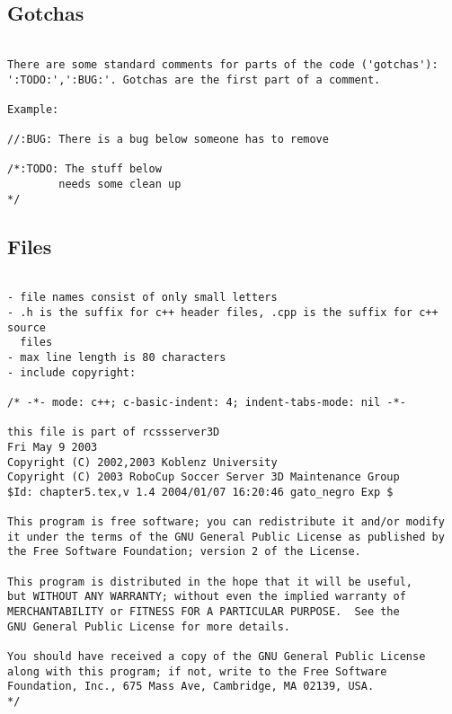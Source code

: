 \subsection{Gotchas}
\begin{verbatim}

There are some standard comments for parts of the code ('gotchas'): 
':TODO:',':BUG:'. Gotchas are the first part of a comment.

Example:

//:BUG: There is a bug below someone has to remove

/*:TODO: The stuff below
        needs some clean up
*/

\end{verbatim}
\subsection{Files}
\begin{verbatim}

- file names consist of only small letters
- .h is the suffix for c++ header files, .cpp is the suffix for c++ source 
  files
- max line length is 80 characters
- include copyright:

/* -*- mode: c++; c-basic-indent: 4; indent-tabs-mode: nil -*-
   
this file is part of rcssserver3D
Fri May 9 2003
Copyright (C) 2002,2003 Koblenz University
Copyright (C) 2003 RoboCup Soccer Server 3D Maintenance Group
$Id: chapter5.tex,v 1.4 2004/01/07 16:20:46 gato_negro Exp $

This program is free software; you can redistribute it and/or modify
it under the terms of the GNU General Public License as published by
the Free Software Foundation; version 2 of the License.
  
This program is distributed in the hope that it will be useful,
but WITHOUT ANY WARRANTY; without even the implied warranty of
MERCHANTABILITY or FITNESS FOR A PARTICULAR PURPOSE.  See the
GNU General Public License for more details.
 
You should have received a copy of the GNU General Public License
along with this program; if not, write to the Free Software
Foundation, Inc., 675 Mass Ave, Cambridge, MA 02139, USA.
*/

\end{verbatim}
